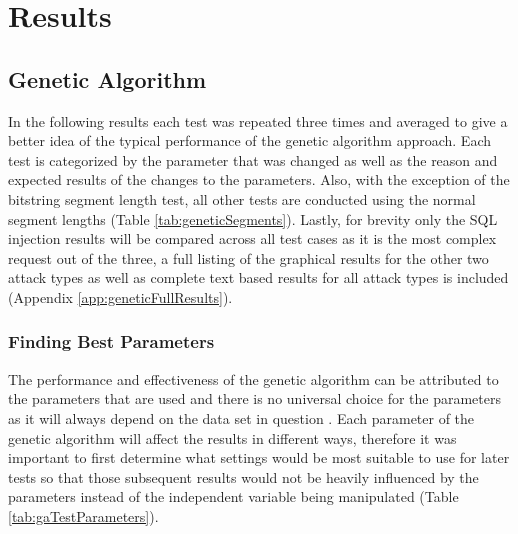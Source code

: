 \chapter{Results} 

\section{Genetic Algorithm}

In the following results each test was repeated three times and averaged to give a better idea of the typical performance of the genetic algorithm approach.  Each test is categorized by the parameter that was changed as well as the reason and expected results of the changes to the parameters.  Also, with the exception of the bitstring segment length test, all other tests are conducted using the normal segment lengths (Table \ref{tab:geneticSegments}).  Lastly, for brevity only the SQL injection results will be compared across all test cases as it is the most complex request out of the three, a full listing of the graphical results for the other two attack types as well as complete text based results for all attack types is included (Appendix \ref{app:geneticFullResults}).

\subsection{Finding Best Parameters}

The performance and effectiveness of the genetic algorithm can be attributed to the parameters that are used and there is no universal choice for the parameters as it will always depend on the data set in question \cite{optimalPopulationGenetic}.  Each parameter of the genetic algorithm will affect the results in different ways, therefore it was important to first determine what settings would be most suitable to use for later tests so that those subsequent results would not be heavily influenced by the parameters instead of the independent variable being manipulated (Table \ref{tab:gaTestParameters}).  

